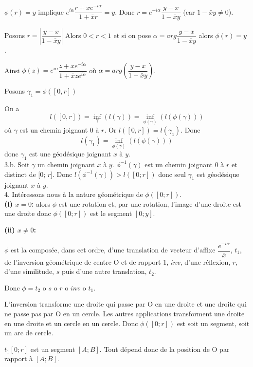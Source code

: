 \documentclass[a4paper, 12pt, twoside]{book}
\begin{document}
   $\phi(r)=y$ implique $e^{i\alpha}\dfrac{r+xe^{-i\alpha}}{1+\bar{x}r}= y$. Donc $r=e^{-i\alpha}\dfrac{y-x}{1-\bar{x}y}$ (car $1-\bar{x}y\neq 0$).
   
   Posons $r=|\dfrac{y-x}{1-\bar{x}y}|$    Alors $0<r<1$ et si on pose $\alpha=arg\dfrac{y-x}{1-\bar{x}y}$ alors $\phi(r)=y$.\
   
   Ainsi $\phi(z)=e^{i\alpha}\dfrac{z+xe^{-i\alpha}}{1+\bar{x}ze^{i\alpha}}$ où $\alpha=arg(\dfrac{y-x}{1-\bar{x}y})$.\
   
   Posons $\gamma_{1}=\phi([0,r])$\
   
   On a $$l([0,r])=\inf_{\gamma}(l(\gamma))=\inf_{\phi(\gamma)}(l(\phi(\gamma)))$$ où $\gamma$ est un chemin joignant 0 à $r$. Or $l([0,r])=l(\gamma_{1})$. Donc 
   $$l(\gamma_{1})=\inf_{\phi(\gamma)}(l(\phi(\gamma)))$$ donc $\gamma_{1}$ est une géodésique joignant $x$ à $y$.\\
   
   3.b. Soit $\gamma$ un chemin joignant $x$ à $y$. $\phi^{-1}(\gamma)$ est un chemin joignant 0 à $r$ et distinct de [0; $r$]. Donc $l(\phi^{-1}(\gamma))>l([0; r])$ donc seul   $\gamma_{1}$ est géodésique joignant $x$ à $y$.\\
   
  4. Intéressons nous à la nature géométrique de  $\phi([0; r])$.\\
   
   \textbf{(i) $x=0$:} alors $\phi$ est une rotation et, par une rotation, l'image d'une droite est une droite donc  $\phi([0; r])$ est le segment  $[0; y]$.
   
   \textbf{(ii) $x\neq0$: }
   
  
  $\phi$ est la composée, dans cet ordre, d'une translation de vecteur d'affixe $\dfrac{e^{-i\alpha}}{\bar{x}}$, $t_{1}$, de l'inversion géométrique de centre O et de rapport 1, $inv$, d'une réflexion, $r$, d'une similitude, $s$ puis d'une autre translation, $t_{2}$.\
  
   Donc $\phi=t_{2}$ o $s$ o $r$ o $inv$ o $t_{1}$.
  
  L'inversion transforme une droite qui passe par O en une droite et une droite qui ne passe pas par O  en un cercle. Les autres applications transforment une droite en une droite et un cercle en un cercle. Donc  $\phi([0; r])$ est soit un segment, soit un arc de cercle.\
  
  $t_{1}[0; r]$ est un segment $[A; B]$. Tout dépend donc de la position de O par rapport à $[A; B]$.\\
  
\end{document}
